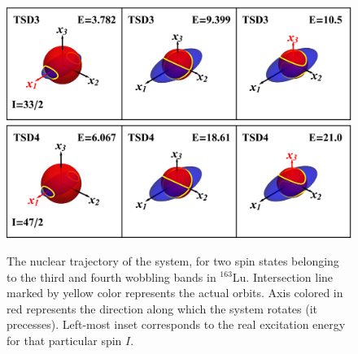 \documentclass[11pt]{article}
\begin{document}
\begin{figure}
    \centering
    \includegraphics[scale=0.7]{figs/tsd3_spin1.eps}
    \includegraphics[scale=0.7]{figs/tsd4_spin1.eps}
    \caption{The nuclear trajectory of the system, for two spin states belonging to the third and fourth wobbling bands in $^{163}$Lu. Intersection line marked by yellow color represents the actual orbits. Axis colored in red represents the direction along which the system rotates (it precesses). Left-most inset corresponds to the real excitation energy for that particular spin $I$.}
    \label{trajectories-34}
\end{figure}
\end{document}
